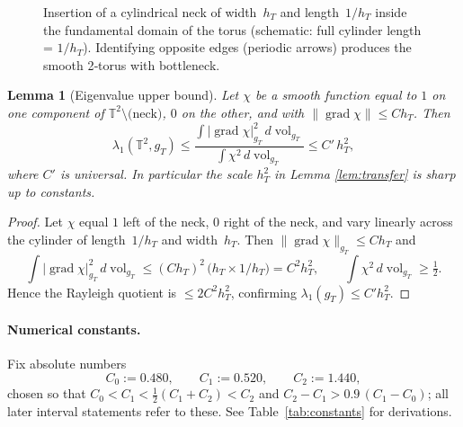 \documentclass[11pt]{article}
\newtheorem{lemma}[theorem]{Lemma}
\theoremstyle{definition}\newtheorem{definition}[theorem]{Definition}
\theoremstyle{remark}\newtheorem{remark}[theorem]{Remark}
\DeclareMathOperator{\grad}{grad}
\DeclareMathOperator{\vol}{vol}
\begin{document}
\begin{figure}[t]
\centering
{}
\caption{Insertion of a cylindrical neck of width~$h_T$ and
length~$1/h_T$ inside the fundamental domain of the torus (schematic: full cylinder length = $1/h_T$).  Identifying
opposite edges (periodic arrows) produces the smooth 2‑torus with bottleneck.}
\label{fig:neck}
\end{figure}

\begin{lemma}[Eigenvalue upper bound]\label{lem:upper2}
Let $\chi$ be a smooth function equal to $1$ on one component of
$\mathbb T^{2}\setminus\text{(neck)}$, $0$ on the other, and with
$\|\grad\chi\|\le C h_T$. Then
\[
\lambda_1(\mathbb T^{2},g_T)
\le
\frac{\int |\grad\chi|_{g_T}^{2}\,d\vol_{g_T}}
     {\int \chi^{2}\,d\vol_{g_T}}
\le
C'\,h_T^{2},
\]
where $C'$ is universal. In particular the scale $h_T^{2}$ in
Lemma \ref{lem:transfer} is sharp up to constants.
\end{lemma}

\begin{proof}
Let $\chi$ equal $1$ left of the neck, $0$ right of the neck, and vary
linearly across the cylinder of length~$1/h_T$ and width~$h_T$.  Then
$\|\grad\chi\|_{g_T}\le Ch_T$ and
\[
  \int |\grad\chi|_{g_T}^{2}\,d\vol_{g_T}
     \le (Ch_T)^{2}\,\bigl(h_T\times 1/h_T\bigr)
     = C^{2}h_T^{2},
\qquad
  \int \chi^{2}\,d\vol_{g_T}\ge \tfrac12 .
\]
Hence the Rayleigh quotient is
$ \le 2C^{2}h_T^{2}$, confirming $\lambda_{1}(g_T)\le C' h_T^{2}$.
\end{proof}

\paragraph{Numerical constants.}
Fix absolute numbers
\[
   C_0:=0.480,\qquad
   C_1:=0.520,\qquad
   C_2:=1.440,
\]
chosen so that $C_0<C_1<\tfrac12(C_1+C_2)<C_2$ and
$C_2-C_1>0.9\,(C_1-C_0)$; all later
interval statements refer to these. See Table~\ref{tab:constants} for derivations.
\end{document}
